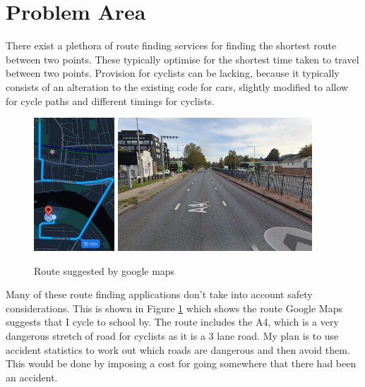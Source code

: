 \documentclass[11pt,twoside,a4paper]{report}
\begin{document}
\section{Problem Area}
There exist a plethora of route finding services for finding the shortest route between two points. 
These typically optimise for the shortest time taken to travel between two points.
Provision for cyclists can be lacking, because it typically consists of an alteration to the existing code for cars, slightly modified to allow for cycle paths and different timings for cyclists.\\
\begin{figure}[t]
    \begin{center}
        \includegraphics[height=5cm]{route.jpg}
    \includegraphics[height=5cm]{dangerous.png}
\end{center}
    \caption{Route suggested by google maps}
\label{route}
\end{figure}
Many of these route finding applications don't take into account safety considerations. This is shown in Figure \ref{route} which shows the route Google Maps suggests that I cycle to school by. The route includes the A4, which is a very dangerous stretch of road for cyclists as it is a 3 lane road. 
My plan is to use accident statistics to work out which roads are dangerous and then avoid them. This would be done by imposing a cost for going somewhere that there had been an accident.
\end{document}
